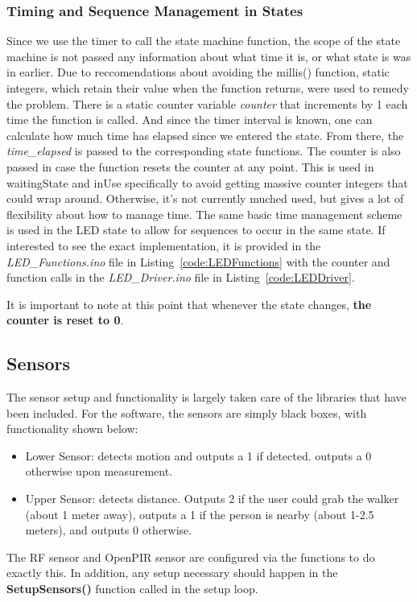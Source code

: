 \documentclass{article}
\begin{document}
\subsubsection{Timing and Sequence Management in States}
Since we use the timer to call the state machine function, the scope of the state machine is not passed any information about what time it is, or what state is was in earlier. Due to reccomendations about avoiding the millis() function, static integers, which retain their value when the function returns, were used to remedy the problem. There is a static counter variable \textsl{counter} that increments by 1 each time the function is called. And since the timer interval is known, one can calculate how much time has elapsed since we entered the state. From there, the \textsl{time\_elapsed} is passed to the corresponding state functions. The counter is also passed in case the function resets the counter at any point. This is used in waitingState and inUse specifically to avoid getting massive counter integers that could wrap around. Otherwise, it's not currently muched used, but gives a lot of flexibility about how to manage time. The same basic time management scheme is used in the LED state to allow for sequences to occur in the same state. If interested to see the exact implementation, it is provided in the \textit{LED\_Functions.ino} file in Listing~\ref{code:LEDFunctions} with the counter and function calls in the \textit{LED\_Driver.ino} file in Listing~\ref{code:LEDDriver}. 

It is important to note at this point that whenever the state changes, \textbf{the counter is reset to 0}. 

\subsection{Sensors}
The sensor setup and functionality is largely taken care of the libraries that have been included. For the software, the sensors are simply black boxes, with functionality shown below:
\begin{itemize}
	\item Lower Sensor: detects motion and outputs a 1 if detected. outputs a 0 otherwise upon measurement. 
	\item Upper Sensor: detects distance. Outputs 2 if the user could grab the walker (about 1 meter away), outputs a 1 if the person is nearby (about 1-2.5 meters), and outputs 0 otherwise. 
\end{itemize}  
The RF sensor and OpenPIR sensor are configured via the functions to do exactly this. In addition, any setup necessary should happen in the \textbf{SetupSensors()} function called in the setup loop.
\end{document}

